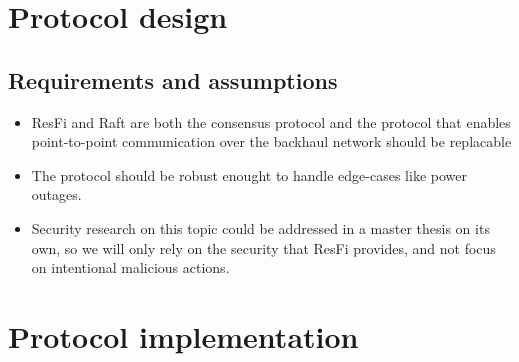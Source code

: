 \section{Protocol design}
\subsection{Requirements and assumptions}
\begin{itemize} 
	\item ResFi and Raft are both the consensus protocol and the protocol that enables point-to-point communication over the backhaul network should
		be replacable
	\item The protocol should be robust enought to handle edge-cases like power outages.
	\item Security research on this topic could be addressed in a master thesis on its own, so we will only rely on the security that ResFi provides, and not focus on intentional 
		malicious actions.
\end{itemize}

\section{Protocol implementation}
